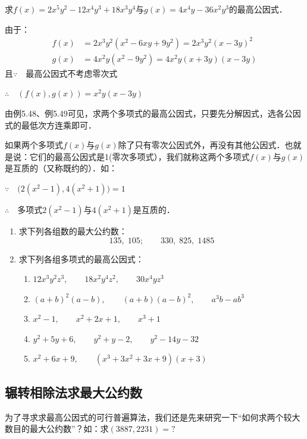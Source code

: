 \begin{example}
求$f(x)=2x^5y^2-12x^4y^3+18x^3y^4$与$g(x)=4x^4y-36x^2y^3$的最高公因式．
\end{example}

\begin{solution}
由于：\[\begin{split}
    f(x)&=2x^3y^2 (x^2-6xy+9y^2)=2x^3y^2(x-3y)^2\\
    g(x)&=4x^2y(x^2-9y^2)=4x^2y(x+3y)(x-3y)
\end{split}\]
且$\because\quad $最高公因式不考虑零次式

$\therefore\quad (f(x),g(x))=x^2y(x-3y)$
\end{solution}

由例5.48、例5.49可见，求两个多项式的最高公因式，只要先分解因式，选各公因式的最低次方连乘即可．

如果两个多项式$f(x)$与$g(x)$除了只有零次公因式外，再没有其他公因式．也就是说：它们的最高公因式是1(零次多项式），我们就称这两个多项式$f(x)$与$g(x)$是互质的（又称既约的）．如：

$\because\quad \big(2 (x^2-1) , 4 (x^2+1) \big) =1$

$\therefore\quad $多项式$2(x^2-1)$与$4(x^2+1)$是互质的．

\begin{ex}
\begin{enumerate}
    \item 求下列各组数的最大公约数：
    \[135,\; 105;\qquad 330,\; 825,\; 1485\]
    \item 求下列各组多项式的最高公因式：
\begin{enumerate}
    \item $12x^3y^2z^3,\qquad 18x^2y^4z^2,\qquad 30x^4yz^3$
    \item $(a+b)^2(a-b),\qquad (a+b)(a-b)^2,\qquad a^3b-ab^3$
    \item $x^2-1,\qquad x^2+2x+1,\qquad x^3+1$
    \item $y^2+5y+6,\qquad y^2+y-2,\qquad y^2-14y-32$
    \item $x^2+6x+9,\qquad (x^3+3x^2+3x+9)(x+3)$
\end{enumerate}
\end{enumerate}    
\end{ex}

\subsection{辗转相除法求最大公约数}

为了寻求求最高公因式的可行普遍算法，我们还是先来研究一下“如何求两个较大数目的最大公约数”？如：求$(3887, 2231)=?$

